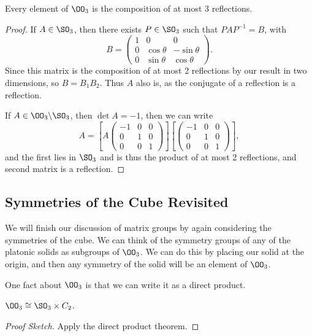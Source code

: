 \documentclass[a4paper]{scrartcl}
\begin{document}
\begin{corollary}
	Every element of $\OO_3$ is the composition of at most 3 reflections.
\end{corollary}
\begin{proof}
	If $A \in \SO_3$, then there exists $P \in \SO_3$ such that $PAP^{-1} = B$, with
	$$
	B = \begin{pmatrix}
		1 & 0 & 0 \\
		0 & \cos \theta & - \sin \theta \\
		0 & \sin \theta & \cos \theta
	\end{pmatrix}.
	$$
	Since this matrix is the composition of at most 2 reflections by our result in two dimensions, so $B = B_1 B_2$. Thus $A$ also is, as the conjugate of a reflection is a reflection.

	If $A \in \OO_3 \backslash \SO_3$, then $\det A = -1$, then we can write
	$$
	A = \left[A \begin{pmatrix}
		-1 & 0 & 0 \\
		0 & 1 & 0 \\
		0 & 0 & 1
	\end{pmatrix}\right] \left[\begin{pmatrix}
		-1 & 0 & 0 \\
		0 & 1 & 0 \\
		0 & 0 & 1
	\end{pmatrix}\right],
	$$
	and the first lies in $\SO_3$ and is thus the product of at most 2 reflections, and second matrix is a reflection.
\end{proof}



\subsection{Symmetries of the Cube Revisited}

We will finish our discussion of matrix groups by again considering the symmetries of the cube.
We can think of the symmetry groups of any of the platonic solids as subgroups of $\OO_3$. We can do this by placing our solid at the origin, and then any symmetry of the solid will be an element of $\OO_3$.

One fact about $\OO_3$ is that we can write it as a direct product.

\begin{lemma}
	$\OO_3 \cong \SO_3 \times C_2$.
\end{lemma}
\begin{proof}[Proof Sketch] Apply the direct product theorem.
\end{proof}
\end{document}

